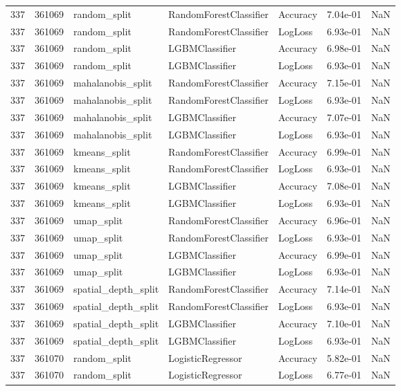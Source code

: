 \begin{tabular}{rrlllrr}
337 & 361069 & random\_split & RandomForestClassifier & Accuracy & 7.04e-01 & NaN \\
337 & 361069 & random\_split & RandomForestClassifier & LogLoss & 6.93e-01 & NaN \\
337 & 361069 & random\_split & LGBMClassifier & Accuracy & 6.98e-01 & NaN \\
337 & 361069 & random\_split & LGBMClassifier & LogLoss & 6.93e-01 & NaN \\
337 & 361069 & mahalanobis\_split & RandomForestClassifier & Accuracy & 7.15e-01 & NaN \\
337 & 361069 & mahalanobis\_split & RandomForestClassifier & LogLoss & 6.93e-01 & NaN \\
337 & 361069 & mahalanobis\_split & LGBMClassifier & Accuracy & 7.07e-01 & NaN \\
337 & 361069 & mahalanobis\_split & LGBMClassifier & LogLoss & 6.93e-01 & NaN \\
337 & 361069 & kmeans\_split & RandomForestClassifier & Accuracy & 6.99e-01 & NaN \\
337 & 361069 & kmeans\_split & RandomForestClassifier & LogLoss & 6.93e-01 & NaN \\
337 & 361069 & kmeans\_split & LGBMClassifier & Accuracy & 7.08e-01 & NaN \\
337 & 361069 & kmeans\_split & LGBMClassifier & LogLoss & 6.93e-01 & NaN \\
337 & 361069 & umap\_split & RandomForestClassifier & Accuracy & 6.96e-01 & NaN \\
337 & 361069 & umap\_split & RandomForestClassifier & LogLoss & 6.93e-01 & NaN \\
337 & 361069 & umap\_split & LGBMClassifier & Accuracy & 6.99e-01 & NaN \\
337 & 361069 & umap\_split & LGBMClassifier & LogLoss & 6.93e-01 & NaN \\
337 & 361069 & spatial\_depth\_split & RandomForestClassifier & Accuracy & 7.14e-01 & NaN \\
337 & 361069 & spatial\_depth\_split & RandomForestClassifier & LogLoss & 6.93e-01 & NaN \\
337 & 361069 & spatial\_depth\_split & LGBMClassifier & Accuracy & 7.10e-01 & NaN \\
337 & 361069 & spatial\_depth\_split & LGBMClassifier & LogLoss & 6.93e-01 & NaN \\
337 & 361070 & random\_split & LogisticRegressor & Accuracy & 5.82e-01 & NaN \\
337 & 361070 & random\_split & LogisticRegressor & LogLoss & 6.77e-01 & NaN \\

\end{tabular}

